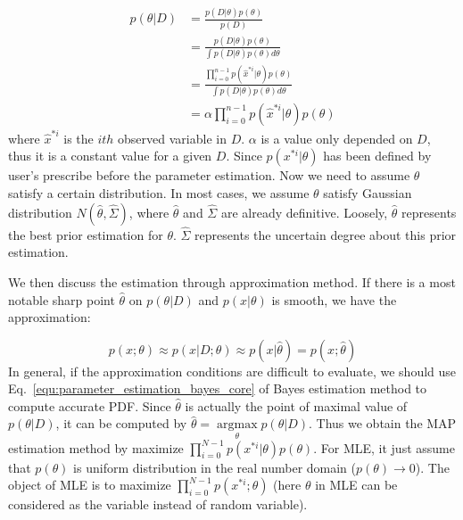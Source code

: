 \documentclass[runningheads,openany]{xhlPaper}
\begin{document}
\begin{equation}
\label{equ:parameter_estimation_theta_D}
\begin{aligned}
p\left( {\theta |D} \right) &= \frac{{p\left( {D|\theta } \right)p\left( \theta  \right)}}{{p\left( D \right)}}\\
 &= \frac{{p\left( {D|\theta } \right)p\left( \theta  \right)}}{{\int {p\left( {D|\theta } \right)p\left( \theta  \right)d\theta } }}\\
 &= \frac{{\prod\limits_{i = 0}^{n - 1} {p\left( {{{\hat x}^{*i}}|\theta } \right)} p\left( \theta  \right)}}{{\int {p\left( {D|\theta } \right)p\left( \theta  \right)d\theta } }}\\
 &= \alpha \prod\limits_{i = 0}^{n - 1} {p\left( {{{\hat x}^{*i}}|\theta } \right)} p\left( \theta  \right)
\end{aligned}
\end{equation}
where ${\hat x}^{*i}$ is the $ith$ observed variable in $D$. $\alpha$ is a value only depended on $D$, thus it is a constant value for a given $D$.
Since ${p\left( {{x^{*i}}|\theta } \right)}$ has been defined by user's prescribe before the parameter estimation. Now we need to assume $\theta$ satisfy a certain distribution. 
In most cases, we assume $\theta$ satisfy Gaussian distribution $N\left( {\hat \theta ,\hat \Sigma } \right)$, where $\hat \theta$ and $\hat \Sigma$ are already definitive.
Loosely, $\hat \theta$ represents the best prior estimation for $\theta$. $\hat \Sigma$ represents the uncertain degree about this prior estimation.

We then discuss the estimation through approximation method.
If there is a most notable sharp point ${\hat \theta }$ on ${p\left( {\theta |D} \right)}$ and $p\left( {x|\theta } \right)$ is smooth, we have the approximation:

\begin{displaymath}
\label{equ:parameter_estimation_bayes_sharp_point_approximation}
p\left( {x;\theta } \right) \approx p\left( {x|D;\theta } \right) \approx p\left( {x|\hat \theta } \right) = p\left( {x;\hat \theta } \right)
\end{displaymath}
In general, if the approximation conditions are difficult to evaluate, we should use Eq.~\ref{equ:parameter_estimation_bayes_core} of Bayes estimation method to compute accurate PDF.
Since $\hat{\theta}$ is actually the point of maximal value of $p\left( {\theta |D} \right)$, it can be computed by $\hat \theta  = \mathop {\arg \max }\limits_\theta  p\left( {\theta |D} \right)$.
Thus we obtain the MAP estimation method by maximize ${\prod\limits_{i = 0}^{N - 1} {p\left( {{x^{*i}}|\theta } \right)} p\left( \theta  \right)}$. For MLE, it just assume that $p\left(\theta\right)$ is uniform distribution in the real number domain ($p\left( \theta  \right) \to 0$). The object of MLE is to maximize ${\prod\limits_{i = 0}^{N - 1} {p\left( {{x^{*i}};\theta } \right)}}$ (here $\theta$ in MLE can be considered as the variable instead of random variable).
\end{document}

